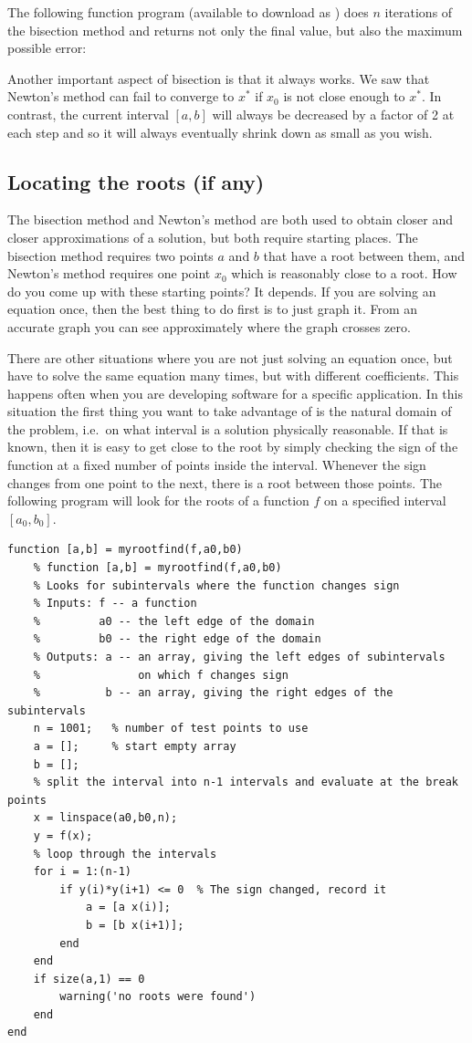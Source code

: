 The following function program (available to download as )
does $n$ iterations of
the bisection method and returns not only the final value,
but also the maximum possible error:


Another important aspect of bisection is that it always works.
We saw that Newton's method can fail to converge to $x^*$
if $x_0$ is not close enough to $x^*$. In contrast, the current
interval $[a,b]$  will always be decreased by a factor
of 2 at each step and so it will always eventually shrink down as
small as you wish.


\subsection*{Locating the roots (if any)}

The bisection method and Newton's method are both used
to obtain closer and closer approximations of a solution,
but both require starting places. The bisection method
requires two points $a$ and $b$ that have a root between
them, and Newton's method requires one point $x_0$ which
is reasonably close to a root. How do you come
up with these starting points? It depends. If you are solving
an equation once, then the best thing to do first is
to just graph it. From an accurate graph you can see approximately
where the graph crosses zero.

There are other situations where you are not just solving
an equation once, but have to solve the same equation many
times, but with different coefficients. This happens often
when you are developing software for a specific application.
In this situation the first thing you want to take advantage
of is the natural domain of the problem, i.e.~on what interval
is a solution physically reasonable. If that is known, then
it is easy to get close to the root by simply checking the
sign of the function at a fixed number of points inside the
interval. Whenever the sign changes from one point to the
next, there is a root between those points. The following
program will look for the roots of a function $f$ on a specified
interval $[a_0,b_0]$.
\begin{lstlisting}
function [a,b] = myrootfind(f,a0,b0)
    % function [a,b] = myrootfind(f,a0,b0)
    % Looks for subintervals where the function changes sign
    % Inputs: f -- a function
    %         a0 -- the left edge of the domain
    %         b0 -- the right edge of the domain
    % Outputs: a -- an array, giving the left edges of subintervals
    %               on which f changes sign
    %          b -- an array, giving the right edges of the subintervals
    n = 1001;   % number of test points to use
    a = [];     % start empty array
    b = [];
    % split the interval into n-1 intervals and evaluate at the break points
    x = linspace(a0,b0,n);
    y = f(x);
    % loop through the intervals
    for i = 1:(n-1)
        if y(i)*y(i+1) <= 0  % The sign changed, record it
            a = [a x(i)];
            b = [b x(i+1)];
        end
    end
    if size(a,1) == 0
        warning('no roots were found')
    end
end
\end{lstlisting}

